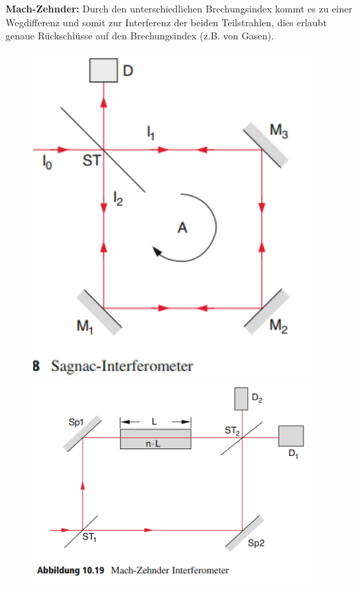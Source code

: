 \documentclass[a4paper, 11pt, ngerman, parskip=half-]{scrartcl}
\begin{document}
\textbf{Mach-Zehnder:} Durch den unterschiedlichen Brechungsindex kommt es zu einer Wegdifferenz und somit zur Interferenz
der beiden Teilstrahlen, dies erlaubt genaue Rückschlüsse auf den Brechungsindex (z.B. von Gasen).
%
\begin{figure}[H]
    \centering
    \begin{minipage}[b]{0.35\textwidth}
        \centering
        \includegraphics[width=0.95\textwidth]{image/18_Interferenz/Sagnac_Interferometer.png}
    \end{minipage}
    \hspace{2cm}
    \begin{minipage}[b]{0.5\textwidth}
        \centering
        \includegraphics[width=0.95\textwidth]{image/18_Interferenz/Mach-Zehnder_Interferometer.png}
    \end{minipage}
\end{figure}
\end{document}
